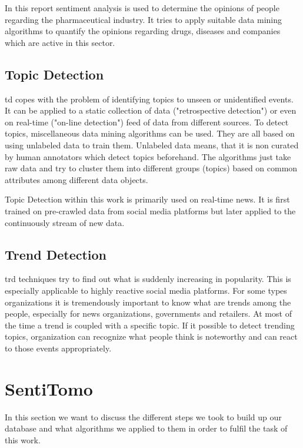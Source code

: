 \documentclass[11pt,titlepage,oneside,openany]{book}
\begin{document}
In this report sentiment analysis is used to determine the opinions of people regarding the pharmaceutical industry. It tries to apply suitable data mining algorithms to quantify the opinions regarding drugs, diseases and companies which are active in this sector.

\section{Topic Detection}
\label{sec:topic_detection}

\acrfull{td} copes with the problem of identifying topics to unseen or unidentified events. It can be applied to a static collection of data ("retrospective detection") or even on real-time ("on-line detection") feed of data from different sources. To detect topics, miscellaneous data mining algorithms can be used. They are all based on using unlabeled data to train them. Unlabeled data means, that it is non curated by human annotators which detect topics beforehand. The algorithms just take raw data and try to cluster them into different groups (topics) based on common attributes among different data objects. \cite{Seo2004}

Topic Detection within this work is primarily used on real-time news. It is first trained on pre-crawled data from social media platforms but later applied to the continuously stream of new data.

\section{Trend Detection}
\label{sec:trend_detection}

\acrfull{trd} techniques try to find out what is suddenly increasing in popularity. This is especially applicable to highly reactive social media platforms. For some types organizations it is tremendously important to know what are trends among the people, especially for news organizations, governments and retailers. 
At most of the time a trend is coupled with a specific topic. If it possible to detect trending topics, organization can recognize what people think is noteworthy and can react to those events appropriately. \cite{Kolb2015-07-16}

\chapter{SentiTomo}
\label{cha:sentitomo}

In this section we want to discuss the different steps we took to build up our database and what algorithms we applied to them in order to fulfil the task of this work.
\end{document}
